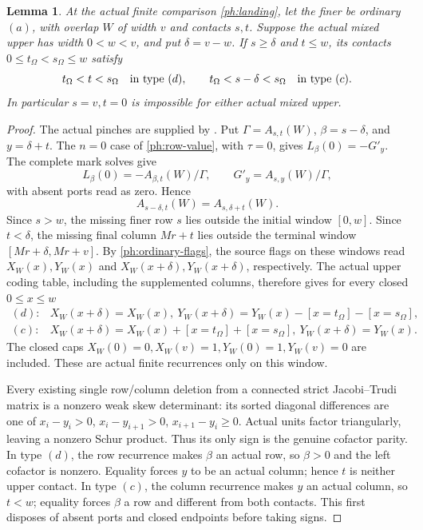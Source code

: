 \documentclass[11pt,a4paper]{amsart}
\numberwithin{equation}{section}
\theoremstyle{plain}
\newtheorem{lemma}[theorem]{Lemma}
\theoremstyle{definition}
\begin{document}
\begin{lemma}\label{ph:mixed-upper-sign}
At the actual finite comparison \eqref{ph:landing}, let the finer be
ordinary \((a)\), with overlap \(W\) of width \(v\) and contacts
\(s,t\).  Suppose the actual mixed upper has width \(0<w<v\), and put
\(\delta=v-w\).  If \(s\ge\delta\) and \(t\le w\), its contacts
\(0\le t_\Omega<s_\Omega\le w\) satisfy
\[
 t_\Omega<t<s_\Omega\quad\hbox{in type }(d),\qquad
 t_\Omega<s-\delta<s_\Omega\quad\hbox{in type }(c).
\]
In particular \(s=v,t=0\) is impossible for either actual mixed upper.
\end{lemma}
\begin{proof}
The actual pinches are supplied by .
Put \(\Gamma=A_{s,t}(W)\), \(\beta=s-\delta\), and \(y=\delta+t\).
The \(n=0\) case of \eqref{ph:row-value}, with \(\tau=0\), gives
\(L_\beta(0)=-G'_y\).  The complete mark solves give
\[
 L_\beta(0)=-A_{\beta,t}(W)/\Gamma,\qquad
 G'_y=A_{s,y}(W)/\Gamma,
\]
with absent ports read as zero.  Hence
\[
 A_{s-\delta,t}(W)=A_{s,\delta+t}(W).
\]
Since \(s>w\), the missing finer row \(s\) lies outside the initial
window \([0,w]\).  Since \(t<\delta\), the missing final column
\(Mr+t\) lies outside the terminal window \([Mr+\delta,Mr+v]\).
By \eqref{ph:ordinary-flags}, the source flags on these windows read
\(X_W(x),Y_W(x)\) and \(X_W(x+\delta),Y_W(x+\delta)\), respectively.
The actual upper coding table, including the supplemented columns,
therefore gives for every closed \(0\le x\le w\)
\[
 \begin{array}{ll}
 (d):&X_W(x+\delta)=X_W(x),\
 Y_W(x+\delta)=Y_W(x)-[x=t_\Omega]-[x=s_\Omega],\\
 (c):&X_W(x+\delta)=X_W(x)+[x=t_\Omega]+[x=s_\Omega],\
 Y_W(x+\delta)=Y_W(x).
 \end{array}
\]
The closed caps \(X_W(0)=0,X_W(v)=1,Y_W(0)=1,Y_W(v)=0\)
are included.  These are actual finite recurrences only on this window.

Every existing single row/column deletion from a connected strict
Jacobi--Trudi matrix is a nonzero weak skew determinant:
its sorted diagonal differences are one of
\(x_i-y_i>0\), \(x_i-y_{i+1}>0\),
\(x_{i+1}-y_i\ge0\).
Actual units factor triangularly, leaving a nonzero Schur product.
Thus its only sign is the genuine cofactor parity.
In type \((d)\), the row recurrence makes \(\beta\) an actual row,
so \(\beta>0\) and the left cofactor is nonzero.
Equality forces \(y\) to be an actual column; hence \(t\) is neither
upper contact.  In type \((c)\), the column recurrence makes \(y\)
an actual column, so \(t<w\); equality forces \(\beta\) a row and
different from both contacts.  This first disposes of absent ports
and closed endpoints before taking signs.


\end{proof}
\end{document}
